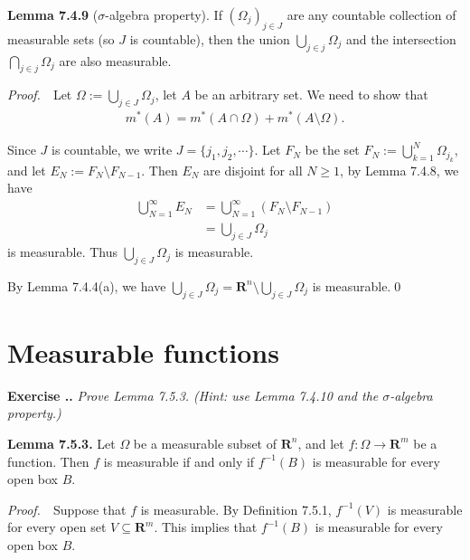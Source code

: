 \documentclass{book}
\newcommand{\pff}{\vspace{.25em}\noindent\emph{Proof.}~~}
\newcommand{\titl}[1]{\noindent\textbf{#1}}
\newcounter{Exercise}[section]
\renewcommand{\theExercise}{\thesection.\arabic{Exercise}.}
\newcommand{\new}{\vspace{1.5em}\noindent\textbf{Exercise \stepcounter{Exercise}\textbf{\theExercise}} }
\begin{document}
\begin{framed}
\titl{Lemma 7.4.9} ($\sigma$-algebra property). If $(\Omega_j)_{j \in J}$ are any countable collection of measurable sets (so $J$ is countable), then the union $\bigcup_{j \in j} \Omega_j$ and the intersection $\bigcap_{j \in j} \Omega_j$ are also measurable.
\end{framed}

\pff Let $\Omega := \bigcup_{j \in J} \Omega_j$, let $A$ be an arbitrary set. We need to show that
    \begin{align*}
        m^*(A) = m^*(A \cap \Omega) + m^*(A \setminus \Omega).
    \end{align*}

Since $J$ is countable, we write $J = \{j_1, j_2, \cdots\}$. Let $F_N$ be the set $F_N := \bigcup_{k = 1}^{N} \Omega_{j_k}$, and let $E_N := F_N \setminus F_{N-1}$. Then $E_N$ are disjoint for all $N\geq 1$, by Lemma 7.4.8, we have
    \begin{align*}
        \bigcup_{N = 1}^{\infty} E_N 
        &= \bigcup_{N = 1}^{\infty} (F_N \setminus F_{N - 1})\\
        &= \bigcup_{j \in J} \Omega_j
    \end{align*}
is measurable. Thus $\bigcup_{j \in J} \Omega_j$ is measurable.

By Lemma 7.4.4(a), we have $\bigcup_{j \in J} \Omega_j = \mathbf{R}^n \setminus \bigcup_{j \in J} \Omega_j$ is measurable.\qed

\section{Measurable functions}

\new\emph{Prove Lemma 7.5.3. (Hint: use Lemma 7.4.10 and the $\sigma$-algebra property.)}

\begin{framed}
\titl{Lemma 7.5.3.} Let $\Omega$ be a measurable subset of $\mathbf{R}^n$, and let $f : \Omega \to \mathbf{R}^m$ be a function. Then $f$ is measurable if and only if $f^{-1}(B)$ is measurable for every open box $B$.
\end{framed}

\pff Suppose that $f$ is measurable. By Definition 7.5.1, $f^{-1}(V)$ is measurable for every open set $V \subseteq \mathbf{R}^m$. This implies that $f^{-1}(B)$ is measurable for every open box $B$.
\end{document}
